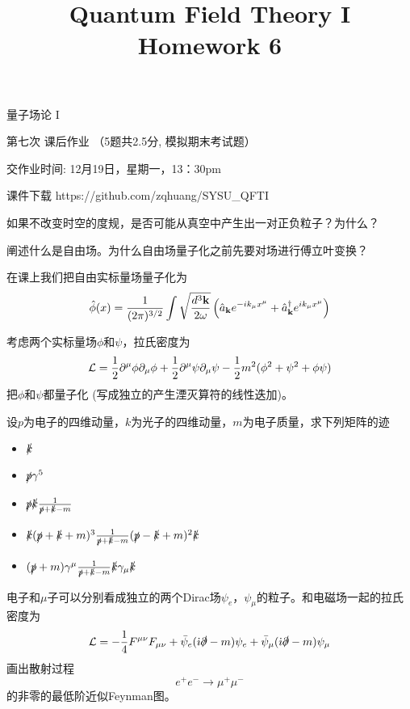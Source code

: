 \documentclass[CJK]{beamer}
\title{Quantum Field Theory I \\ Homework 6}
\author{}
\date{}
\begin{document}
\begin{frame}
 
\begin{center}
\begin{Large}
\bch
量子场论 I 

{\vskip 0.3in}

第七次 课后作业 （5题共2.5分, 模拟期末考试题）

交作业时间: 12月19日，星期一，13：30pm

\ech
\end{Large}
\end{center}

\vskip 0.2in

\bch
课件下载
\ech
https://github.com/zqhuang/SYSU\_QFTI

\end{frame}


\begin{frame}
\bch
如果不改变时空的度规，是否可能从真空中产生出一对正负粒子？为什么？
\ech
\end{frame}

\begin{frame}
\bch
阐述什么是自由场。为什么自由场量子化之前先要对场进行傅立叶变换？
\ech
\end{frame}

\begin{frame}
\bch
在课上我们把自由实标量场量子化为
$$ {\hat{\phi}}(x) = \frac{1}{(2\pi)^{3/2}} \int \sqrt{\frac{d^3{\mathbf{k}}}{2\omega}} \left({\hat{a}}_{{\mathbf{k}}} e^{-ik_\mu x^\mu} + {\hat{a}^\dagger}_{{\mathbf{k}}}e^{ik_\mu x^\mu}\right) $$

考虑两个实标量场$\phi$和$\psi$，拉氏密度为
$${\mathcal{L}} = \frac{1}{2}\partial^\mu\phi\partial_\mu\phi + \frac{1}{2}\partial^\mu\psi\partial_\mu\psi - \frac{1}{2}m^2(\phi^2+\psi^2+\phi\psi) $$
把$\phi$和$\psi$都量子化 (写成独立的产生湮灭算符的线性迭加)。
\ech
\end{frame}


\begin{frame}
\bch
设$p$为电子的四维动量，$k$为光子的四维动量，$m$为电子质量，求下列矩阵的迹
\begin{itemize}
\item{$\slashed{k}$}
\item{$\slashed{p}\gamma^5$}
\item{$\slashed{p}\slashed{k}\frac{1}{\slashed{p}+\slashed{k}-m}$}
\item{$\slashed{k}(\slashed{p}+\slashed{k}+m)^3\frac{1}{\slashed{p}+\slashed{k}-m}(\slashed{p}-\slashed{k}+m)^2\slashed{k}$}
\item{$(\slashed{p}+m)\gamma^\mu\frac{1}{\slashed{p}+\slashed{k} -m}\slashed{k}\gamma_\mu\slashed{k}$}
\end{itemize}
\ech
\end{frame}


\begin{frame}
\bch
电子和$\mu$子可以分别看成独立的两个Dirac场$\psi_e$，$\psi_\mu$的粒子。和电磁场一起的拉氏密度为
$${\mathcal{L}} = -\frac{1}{4}{F^{\mu\nu}}{F_{\mu\nu}} + \bar{\psi}_e({\dot{\imath}} \slashed{\partial} - m)\psi_e + \bar{\psi}_\mu({\dot{\imath}} \slashed{\partial} - m)\psi_\mu$$
画出散射过程
$$e^+e^- \rightarrow \mu^+\mu^-$$
的非零的最低阶近似Feynman图。
\ech
\end{frame}
\end{document}
